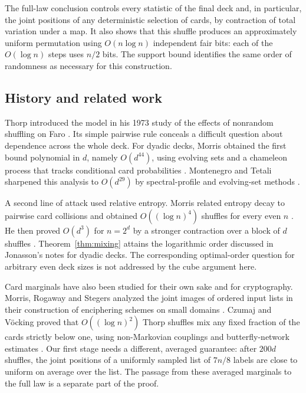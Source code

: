 \documentclass[11pt]{article}
\theoremstyle{remark}
\numberwithin{equation}{section}
\begin{document}
The full-law conclusion controls every statistic of the final deck and,
in particular, the joint positions of any deterministic selection of
cards, by contraction of total variation under a map. It also shows
that this shuffle produces an approximately uniform permutation using
$O(n\log n)$ independent fair bits: each of the $O(\log n)$ steps uses
$n/2$ bits. The support bound identifies the same order of randomness
as necessary for this construction.

\subsection{History and related work}

Thorp introduced the model in his 1973 study of the effects of
nonrandom shuffling on Faro \cite[Section~3.1]{thorp}. Its simple
pairwise rule conceals a difficult question about dependence across the
whole deck. For dyadic decks, Morris obtained the first bound
polynomial in $d$, namely $O(d^{44})$, using evolving sets and a
chameleon process that tracks conditional card probabilities
\cite{morris44}. Montenegro and Tetali sharpened this analysis to
$O(d^{29})$ by spectral-profile and evolving-set methods
\cite[Theorems~6.14--6.15]{montenegro-tetali2006}.

A second line of attack used relative entropy. Morris related entropy
decay to pairwise card collisions and obtained $O((\log n)^4)$
shuffles for every even $n$ \cite{morris4}. He then proved $O(d^3)$
for $n=2^d$ by a stronger contraction over a block of $d$ shuffles
\cite{morris3}. Theorem~\ref{thm:mixing} attains the logarithmic order
discussed in Jonasson's notes \cite[Section~5]{jonasson} for dyadic
decks. The corresponding optimal-order question for arbitrary even
deck sizes is not addressed by the cube argument here.

Card marginals have also been studied for their own sake and for
cryptography. Morris, Rogaway and Stegers analyzed the joint images of
ordered input lists in their construction of enciphering schemes on
small domains \cite[Theorem~1]{mrs}. Czumaj and V\"ocking proved that
$O((\log n)^2)$ Thorp shuffles mix any fixed fraction of the cards
strictly below one, using non-Markovian couplings and butterfly-network
estimates \cite{CzumajVocking2014}. Our first stage needs a different,
averaged guarantee: after $200d$ shuffles, the joint positions of a
uniformly sampled list of $7n/8$ labels are close to uniform on average
over the list. The passage from these averaged marginals to the full
law is a separate part of the proof.
\end{document}
